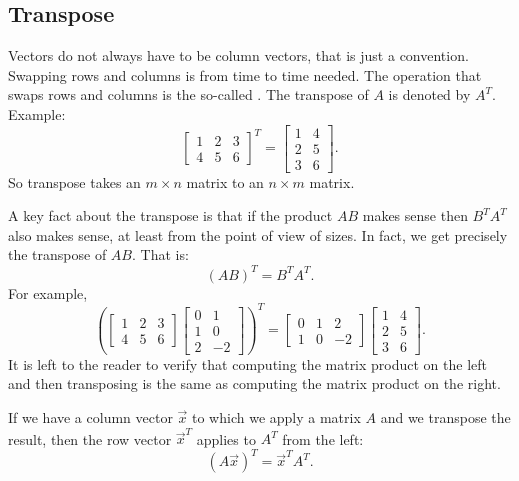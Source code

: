 \subsection{Transpose}

Vectors do not always have to be column vectors,
that is just a convention.
Swapping rows and columns is from time to time needed.
The operation that swaps rows and columns is the so-called
\emph{}.
The transpose of $A$ is denoted by $A^T$.  Example:
\begin{equation*}
\begin{bmatrix}
1 & 2 & 3 \\
4 & 5 & 6
\end{bmatrix}^T =
\begin{bmatrix}
1 & 4 \\
2 & 5 \\
3 & 6 
\end{bmatrix} .
\end{equation*}
So transpose takes an $m \times n$ matrix to an $n \times m$ matrix.

A key fact about the transpose is that if the product $AB$ makes sense
then $B^TA^T$ also makes sense, at least from the point of view of sizes.
In fact, we get precisely the transpose of $AB$.  That is:
\begin{equation*}
{(AB)}^T = B^TA^T .
\end{equation*}
For example,
\begin{equation*}
{\left(
\begin{bmatrix}
1 & 2 & 3 \\
4 & 5 & 6
\end{bmatrix}
\begin{bmatrix}
0 & 1 \\
1 & 0 \\
2 & -2
\end{bmatrix}
\right)}^T =
\begin{bmatrix}
0 & 1 & 2 \\
1 & 0 & -2
\end{bmatrix}
\begin{bmatrix}
1 & 4 \\
2 & 5 \\
3 & 6 
\end{bmatrix} .
\end{equation*}
It is left to the reader to verify that computing the matrix product on the
left and then transposing is the same as computing the matrix product on the
right.

If we have a column vector $\vec{x}$ to which we apply a matrix $A$
and we transpose the result,
then the row vector $\vec{x}^T$ applies to $A^T$ from the left:
\begin{equation*}
{(A\vec{x})}^T = \vec{x}^TA^T .
\end{equation*}

